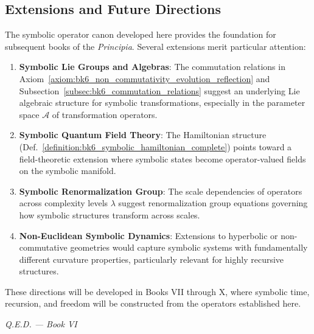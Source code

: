 \subsection{Extensions and Future Directions}
\label{subsec:bk6_extensions_and_future_directions}
The symbolic operator canon developed here provides the foundation for subsequent books of the \textit{Principia}. Several extensions merit particular attention:
\begin{enumerate}
\item \textbf{Symbolic Lie Groups and Algebras}: The commutation relations in Axiom~\ref{axiom:bk6_non_commutativity_evolution_reflection} and Subsection~\ref{subsec:bk6_commutation_relations} suggest an underlying Lie algebraic structure for symbolic transformations, especially in the parameter space $\mathcal{A}$ of transformation operators.
\item \textbf{Symbolic Quantum Field Theory}: The Hamiltonian structure (Def.~\ref{definition:bk6_symbolic_hamiltonian_complete}) points toward a field-theoretic extension where symbolic states become operator-valued fields on the symbolic manifold.
\item \textbf{Symbolic Renormalization Group}: The scale dependencies of operators across complexity levels $\lambda$ suggest renormalization group equations governing how symbolic structures transform across scales.
\item \textbf{Non-Euclidean Symbolic Dynamics}: Extensions to hyperbolic or non-commutative geometries would capture symbolic systems with fundamentally different curvature properties, particularly relevant for highly recursive structures.
\end{enumerate}
These directions will be developed in Books VII through X, where symbolic time, recursion, and freedom will be constructed from the operators established here.
\vspace{1em}
\begin{flushright}
\textit{Q.E.D. — Book VI}
\end{flushright}
